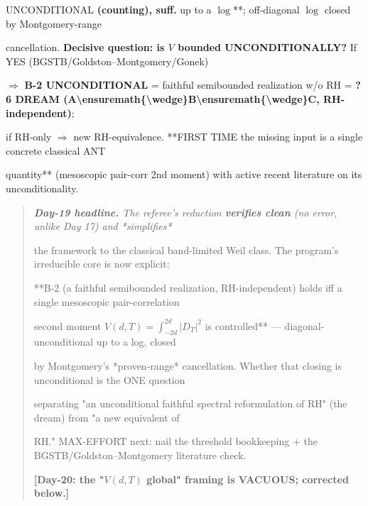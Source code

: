 \documentclass[10pt]{article}
\begin{document}
  UNCONDITIONAL\textbf{ (counting), suff. }up to a $\log$**; off-diagonal $\log$ closed by Montgomery-range\par
  cancellation. \textbf{Decisive question: is $V$ bounded UNCONDITIONALLY?} If YES (BGSTB/Goldston--Montgomery/Gonek)\par
  \ensuremath{\Rightarrow} \textbf{B-2 UNCONDITIONAL} = faithful semibounded realization w/o RH = \textbf{?6 DREAM (A\textbackslash{}ensuremath\{\textbackslash{}wedge\}B\textbackslash{}ensuremath\{\textbackslash{}wedge\}C, RH-independent)};\par
  if RH-only \ensuremath{\Rightarrow} new RH-equivalence. **FIRST TIME the missing input is a single concrete classical ANT\par
  quantity** (mesoscopic pair-corr 2nd moment) with active recent literature on its unconditionality.\par

\begin{quote}\itshape
\textbf{Day-19 headline.} The referee's reduction \textbf{verifies clean} (no error, unlike Day 17) and *simplifies*\par
the framework to the classical band-limited Weil class. The program's irreducible core is now explicit:\par
**B-2 (a faithful semibounded realization, RH-independent) holds iff a single mesoscopic pair-correlation\par
second moment $V(d,T)=\int_{-2d}^{2d}|D_T|^2$ is controlled** --- diagonal-unconditional up to a log, closed\par
by Montgomery's *proven-range* cancellation. Whether that closing is unconditional is the ONE question\par
separating "an unconditional faithful spectral reformulation of RH" (the dream) from "a new equivalent of\par
RH." MAX-EFFORT next: nail the threshold bookkeeping + the BGSTB/Goldston--Montgomery literature check.\par
\textbf{[Day-20: the "$V(d,T)$ global" framing is VACUOUS; corrected below.]}\par
\end{quote}
\end{document}
